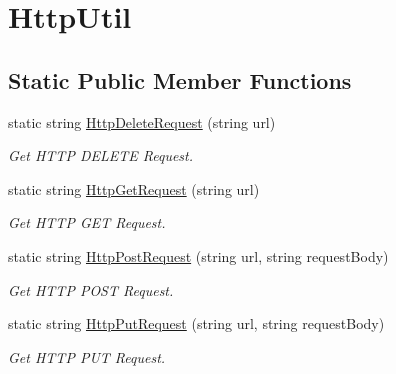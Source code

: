 \hypertarget{classWildlifeTrackingApp_1_1Utility_1_1HttpUtil}{}\section{Http\+Util}
\label{classWildlifeTrackingApp_1_1Utility_1_1HttpUtil}
\subsection*{Static Public Member Functions}
\begin{DoxyCompactItemize}
\item 
static string \hyperlink{classWildlifeTrackingApp_1_1Utility_1_1HttpUtil_a52cfcc90781b77268cfe7039e8fbc0d5}{Http\+Delete\+Request} (string url)
\begin{DoxyCompactList}\small\item\em Get H\+T\+TP D\+E\+L\+E\+TE Request. \end{DoxyCompactList}\item 
static string \hyperlink{classWildlifeTrackingApp_1_1Utility_1_1HttpUtil_acf6038d387a08540e3edd75cfe40d2dd}{Http\+Get\+Request} (string url)
\begin{DoxyCompactList}\small\item\em Get H\+T\+TP G\+ET Request. \end{DoxyCompactList}\item 
static string \hyperlink{classWildlifeTrackingApp_1_1Utility_1_1HttpUtil_a1bfc4f28acf513814c5c63ee2d8d93bc}{Http\+Post\+Request} (string url, string request\+Body)
\begin{DoxyCompactList}\small\item\em Get H\+T\+TP P\+O\+ST Request. \end{DoxyCompactList}\item 
static string \hyperlink{classWildlifeTrackingApp_1_1Utility_1_1HttpUtil_a2f85f442be7b52b26de24a9ac7c86665}{Http\+Put\+Request} (string url, string request\+Body)
\begin{DoxyCompactList}\small\item\em Get H\+T\+TP P\+UT Request. \end{DoxyCompactList}\end{DoxyCompactItemize}
